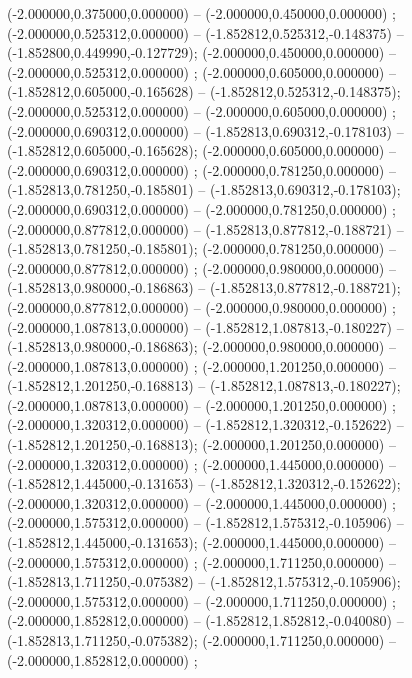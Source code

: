  (-2.000000,0.375000,0.000000) -- (-2.000000,0.450000,0.000000) ;
 (-2.000000,0.525312,0.000000) -- (-1.852812,0.525312,-0.148375) -- (-1.852800,0.449990,-0.127729);
 (-2.000000,0.450000,0.000000) -- (-2.000000,0.525312,0.000000) ;
 (-2.000000,0.605000,0.000000) -- (-1.852812,0.605000,-0.165628) -- (-1.852812,0.525312,-0.148375);
 (-2.000000,0.525312,0.000000) -- (-2.000000,0.605000,0.000000) ;
 (-2.000000,0.690312,0.000000) -- (-1.852813,0.690312,-0.178103) -- (-1.852812,0.605000,-0.165628);
 (-2.000000,0.605000,0.000000) -- (-2.000000,0.690312,0.000000) ;
 (-2.000000,0.781250,0.000000) -- (-1.852813,0.781250,-0.185801) -- (-1.852813,0.690312,-0.178103);
 (-2.000000,0.690312,0.000000) -- (-2.000000,0.781250,0.000000) ;
 (-2.000000,0.877812,0.000000) -- (-1.852813,0.877812,-0.188721) -- (-1.852813,0.781250,-0.185801);
 (-2.000000,0.781250,0.000000) -- (-2.000000,0.877812,0.000000) ;
 (-2.000000,0.980000,0.000000) -- (-1.852813,0.980000,-0.186863) -- (-1.852813,0.877812,-0.188721);
 (-2.000000,0.877812,0.000000) -- (-2.000000,0.980000,0.000000) ;
 (-2.000000,1.087813,0.000000) -- (-1.852812,1.087813,-0.180227) -- (-1.852813,0.980000,-0.186863);
 (-2.000000,0.980000,0.000000) -- (-2.000000,1.087813,0.000000) ;
 (-2.000000,1.201250,0.000000) -- (-1.852812,1.201250,-0.168813) -- (-1.852812,1.087813,-0.180227);
 (-2.000000,1.087813,0.000000) -- (-2.000000,1.201250,0.000000) ;
 (-2.000000,1.320312,0.000000) -- (-1.852812,1.320312,-0.152622) -- (-1.852812,1.201250,-0.168813);
 (-2.000000,1.201250,0.000000) -- (-2.000000,1.320312,0.000000) ;
 (-2.000000,1.445000,0.000000) -- (-1.852812,1.445000,-0.131653) -- (-1.852812,1.320312,-0.152622);
 (-2.000000,1.320312,0.000000) -- (-2.000000,1.445000,0.000000) ;
 (-2.000000,1.575312,0.000000) -- (-1.852812,1.575312,-0.105906) -- (-1.852812,1.445000,-0.131653);
 (-2.000000,1.445000,0.000000) -- (-2.000000,1.575312,0.000000) ;
 (-2.000000,1.711250,0.000000) -- (-1.852813,1.711250,-0.075382) -- (-1.852812,1.575312,-0.105906);
 (-2.000000,1.575312,0.000000) -- (-2.000000,1.711250,0.000000) ;
 (-2.000000,1.852812,0.000000) -- (-1.852812,1.852812,-0.040080) -- (-1.852813,1.711250,-0.075382);
 (-2.000000,1.711250,0.000000) -- (-2.000000,1.852812,0.000000) ;
